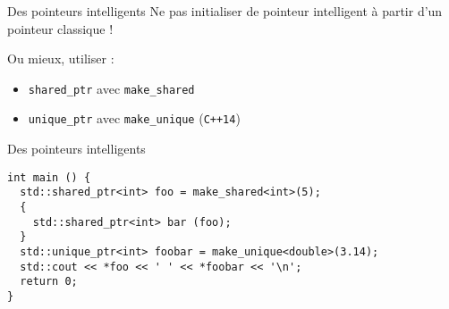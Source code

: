 \begin{frame}{Des pointeurs intelligents}
  Ne pas initialiser de pointeur intelligent à partir d'un pointeur classique !

  Ou mieux, utiliser :
  \begin{itemize}
  \item \texttt{shared\_ptr} avec \texttt{make\_shared}
  \item \texttt{unique\_ptr} avec \texttt{make\_unique} (\texttt{C++14})
  \end{itemize}
\end{frame}

\begin{frame}[fragile]{Des pointeurs intelligents}
  \begin{lstlisting}
int main () {
  std::shared_ptr<int> foo = make_shared<int>(5);
  {
    std::shared_ptr<int> bar (foo);
  }
  std::unique_ptr<int> foobar = make_unique<double>(3.14);
  std::cout << *foo << ' ' << *foobar << '\n';
  return 0;
}
  \end{lstlisting}
\end{frame}
